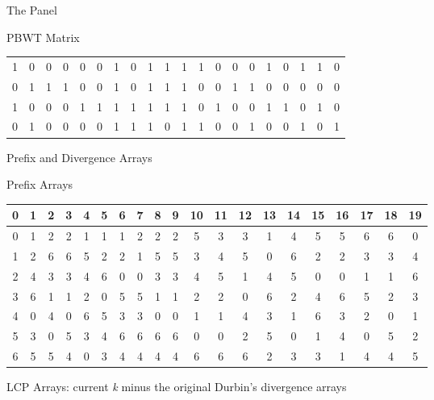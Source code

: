 \documentclass{beamer}
\begin{document}
\begin{frame}{The Panel}
\begin{block}{PBWT Matrix}
\begin{table}[H]
\begin{tabular}{c|c|c|c|c|c|c|c|c|c|c|c|c|c|c|c|c|c|c|c}
        1 & 0 & 0 & 0 & 0 & 0 & 1 & 0 & 1 & 1 & 1 & 1 & 0 & 0 & 0 & 1 & 0 & 1
             & 1 & 0 \\
        0 & 1 & 1 & 1 & 0 & 0 & 1 & 0 & 1 & 1 & 1 & 0 & 0 & 1 & 1 & 0 & 0 & 0
             & 0 & 0 \\
        1 & 0 & 0 & 0 & 1 & 1 & 1 & 1 & 1 & 1 & 1 & 0 & 1 & 0 & 0 & 1 & 1 & 0
             & 1 & 0 \\
        0 & 1 & 0 & 0 & 0 & 0 & 1 & 1 & 1 & 0 & 1 & 1 & 0 & 0 & 1 & 0 & 0 & 1
             & 0 & 1 \\
        \hline
      \end{tabular}
    \end{table}
  \end{block}
\end{frame}
\begin{frame}{Prefix and Divergence Arrays}
  \begin{block}{Prefix Arrays}
    \begin{table}[H]
      \tiny
      \begin{tabular}{c|c|c|c|c|c|c|c|c|c|c|c|c|c|c|c|c|c|c|c}
        \hline
        0 & 1 & 2 & 3 & 4 & 5 & 6 & 7 & 8 & 9 & 10 & 11 & 12 & 13 & 14 & 15 & 16
        & 17 & 18 & 19\\
        \hline
        \hline
        0 & 1 & 2 & 2 & 1 & 1 & 1 & 2 & 2 & 2 & 5 & 3 & 3 & 1 & 4 & 5 & 5 & 6
             & 6 & 0\\  
        1 & 2 & 6 & 6 & 5 & 2 & 2 & 1 & 5 & 5 & 3 & 4 & 5 & 0 & 6 & 2 & 2 & 3
             & 3 & 4\\  
        2 & 4 & 3 & 3 & 4 & 6 & 0 & 0 & 3 & 3 & 4 & 5 & 1 & 4 & 5 & 0 & 0 & 1
             & 1 & 6\\  
        3 & 6 & 1 & 1 & 2 & 0 & 5 & 5 & 1 & 1 & 2 & 2 & 0 & 6 & 2 & 4 & 6 & 5
             & 2 & 3\\  
        4 & 0 & 4 & 0 & 6 & 5 & 3 & 3 & 0 & 0 & 1 & 1 & 4 & 3 & 1 & 6 & 3 & 2
             & 0 & 1\\  
        5 & 3 & 0 & 5 & 3 & 4 & 6 & 6 & 6 & 6 & 0 & 0 & 2 & 5 & 0 & 1 & 4 & 0
             & 5 & 2\\
        6 & 5 & 5 & 4 & 0 & 3 & 4 & 4 & 4 & 4 & 6 & 6 & 6 & 2 & 3 & 3 & 1 & 4
             & 4 & 5\\
        \hline
      \end{tabular}
    \end{table}
  \end{block}
  \begin{block}{LCP Arrays: current \textit{k} minus the original Durbin's
      divergence arrays}  

\end{block}
\end{frame}
\end{document}
